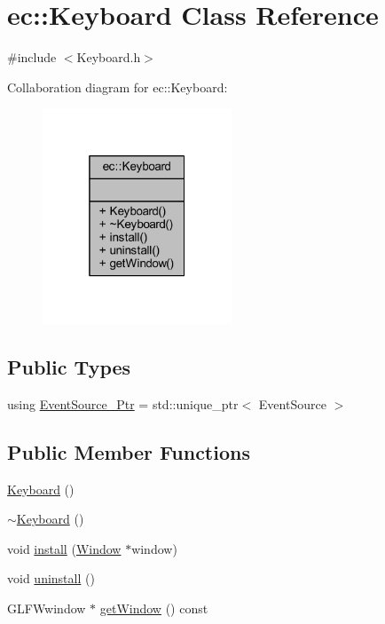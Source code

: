 \hypertarget{classec_1_1_keyboard}{}\section{ec\+:\+:Keyboard Class Reference}
\label{classec_1_1_keyboard}


{\ttfamily \#include $<$Keyboard.\+h$>$}



Collaboration diagram for ec\+:\+:Keyboard\+:\nopagebreak
\begin{figure}[H]
\begin{center}
\leavevmode
\includegraphics[width=160pt]{classec_1_1_keyboard__coll__graph}
\end{center}
\end{figure}
\subsection*{Public Types}
\begin{DoxyCompactItemize}
\item 
using \mbox{\hyperlink{classec_1_1_keyboard_a9d797ac5b4d42f3b586091bcc14e6343}{Event\+Source\+\_\+\+Ptr}} = std\+::unique\+\_\+ptr$<$ Event\+Source $>$
\end{DoxyCompactItemize}
\subsection*{Public Member Functions}
\begin{DoxyCompactItemize}
\item 
\mbox{\hyperlink{classec_1_1_keyboard_aca1d01cce4b8449083c32e2a167a3448}{Keyboard}} ()
\item 
\mbox{\hyperlink{classec_1_1_keyboard_a817f6cd6ea29898c6651dee24de59ba5}{$\sim$\+Keyboard}} ()
\item 
void \mbox{\hyperlink{classec_1_1_keyboard_af792a3b8226096510f6dfecc57697f8e}{install}} (\mbox{\hyperlink{classec_1_1_window}{Window}} $\ast$window)
\item 
void \mbox{\hyperlink{classec_1_1_keyboard_a1e60401ed958ec3d94a77b1dda9f44e8}{uninstall}} ()
\item 
G\+L\+F\+Wwindow $\ast$ \mbox{\hyperlink{classec_1_1_keyboard_ad6b17bd2f2853def1e6ec21fadd9b658}{get\+Window}} () const
\end{DoxyCompactItemize}


